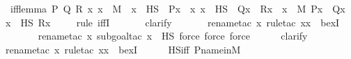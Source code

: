 \begin{isabellebody}
\ iff{\isacharunderscore}{\kern0pt}lemma{\isacharcolon}{\kern0pt}\ {\isachardoublequoteopen}{\isasymAnd}P\ Q\ R{\isachardot}{\kern0pt}\ {\isacharparenleft}{\kern0pt}{\isasymAnd}x{\isachardot}{\kern0pt}\ x\ {\isasymin}\ M\ {\isasymLongrightarrow}\ x\ {\isasymin}\ HS\ {\isasymlongleftrightarrow}\ P{\isacharparenleft}{\kern0pt}x{\isacharparenright}{\kern0pt}{\isacharparenright}{\kern0pt}\ {\isasymLongrightarrow}\ {\isacharparenleft}{\kern0pt}{\isasymAnd}x{\isachardot}{\kern0pt}\ x\ {\isasymin}\ HS\ {\isasymLongrightarrow}\ Q{\isacharparenleft}{\kern0pt}x{\isacharparenright}{\kern0pt}\ {\isasymlongleftrightarrow}\ R{\isacharparenleft}{\kern0pt}x{\isacharparenright}{\kern0pt}{\isacharparenright}{\kern0pt}\ {\isasymLongrightarrow}\ {\isacharparenleft}{\kern0pt}{\isasymexists}x\ {\isasymin}\ M{\isachardot}{\kern0pt}\ P{\isacharparenleft}{\kern0pt}x{\isacharparenright}{\kern0pt}\ {\isasymand}\ Q{\isacharparenleft}{\kern0pt}x{\isacharparenright}{\kern0pt}{\isacharparenright}{\kern0pt}\ {\isasymlongleftrightarrow}\ {\isacharparenleft}{\kern0pt}{\isasymexists}x\ {\isasymin}\ HS{\isachardot}{\kern0pt}\ R{\isacharparenleft}{\kern0pt}x{\isacharparenright}{\kern0pt}{\isacharparenright}{\kern0pt}{\isachardoublequoteclose}\isanewline
\ \ \ \ \isamarkupfalse%
{\isacharparenleft}{\kern0pt}rule\ iffI{\isacharparenright}{\kern0pt}\isanewline
\ \ \ \ \ \isamarkupfalse%
\ clarify\ \isanewline
\ \ \ \ \ \isamarkupfalse%
{\isacharparenleft}{\kern0pt}rename{\isacharunderscore}{\kern0pt}tac\ x{\isacharcomma}{\kern0pt}\ rule{\isacharunderscore}{\kern0pt}tac\ x{\isacharequal}{\kern0pt}x\ \ bexI{\isacharparenright}{\kern0pt}\isanewline
\ \ \ \ \ \ \isamarkupfalse%
{\isacharparenleft}{\kern0pt}rename{\isacharunderscore}{\kern0pt}tac\ x{\isacharcomma}{\kern0pt}\ subgoal{\isacharunderscore}{\kern0pt}tac\ {\isachardoublequoteopen}x\ {\isasymin}\ HS{\isachardoublequoteclose}{\isacharcomma}{\kern0pt}\ force{\isacharcomma}{\kern0pt}\ force{\isacharcomma}{\kern0pt}\ force{\isacharparenright}{\kern0pt}\isanewline
\ \ \ \ \isamarkupfalse%
\ clarify\ \isanewline
\ \ \ \ \isamarkupfalse%
{\isacharparenleft}{\kern0pt}rename{\isacharunderscore}{\kern0pt}tac\ x{\isacharcomma}{\kern0pt}\ rule{\isacharunderscore}{\kern0pt}tac\ x{\isacharequal}{\kern0pt}x\ \ bexI{\isacharparenright}{\kern0pt}\isanewline
\ \ \ \ \isamarkupfalse%
\ HS{\isacharunderscore}{\kern0pt}iff\ P{\isacharunderscore}{\kern0pt}name{\isacharunderscore}{\kern0pt}in{\isacharunderscore}{\kern0pt}M\isanewline

\end{isabellebody}
